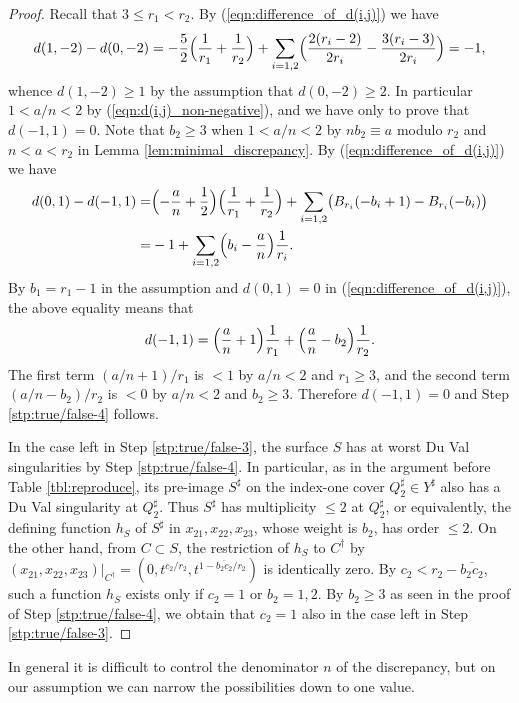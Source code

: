 \documentclass[a4paper,11pt]{amsart}
\theoremstyle{definition}
\theoremstyle{remark}
\numberwithin{equation}{section}
\begin{document}
\begin{proof}
Recall that $3\le r_1<r_2$.
By (\ref{eqn:difference_of_d(i,j)}) we have
\begin{align*}
d(1,-2)-d(0,-2)
= -\frac{5}{2}\Bigl(\frac{1}{r_1}+\frac{1}{r_2}\Bigr)
+\sum_{i=1,2}\Bigl(\frac{2(r_i-2)}{2r_i}-\frac{3(r_i-3)}{2r_i}\Bigr)
= -1,
\end{align*}
whence $d(1,-2)\ge1$ by the assumption that $d(0,-2)\ge2$.
In particular $1<a/n<2$ by (\ref{eqn:d(i,j)_non-negative}),
and we have only to prove that $d(-1,1)=0$.
Note that $b_2\ge3$ when $1<a/n<2$
by $nb_2 \equiv a$ modulo $r_2$
and $n<a<r_2$ in Lemma \ref{lem:minimal_discrepancy}.
By (\ref{eqn:difference_of_d(i,j)}) we have
\begin{align*}
d(0,1)-d(-1,1)
= & \Bigl(-\frac{a}{n}+\frac{1}{2}\Bigr)\Bigl(\frac{1}{r_1}+\frac{1}{r_2}\Bigr)
+\sum_{i=1,2}\bigl(B_{r_i}(-b_i+1)-B_{r_i}(-b_i)\bigr) \\
= & -1+\sum_{i=1,2}\Bigl(b_i-\frac{a}{n}\Bigr)\frac{1}{r_i}.
\end{align*}
By $b_1=r_1-1$ in the assumption
and $d(0,1)=0$ in (\ref{eqn:difference_of_d(i,j)}),
the above equality means that
\begin{align*}
d(-1,1)=\Bigl(\frac{a}{n}+1\Bigr)\frac{1}{r_1}+
\Bigl(\frac{a}{n}-b_2\Bigr)\frac{1}{r_2}.
\end{align*}
The first term $(a/n+1)/r_1$ is $<1$ by $a/n<2$ and $r_1\ge3$,
and the second term $(a/n-b_2)/r_2$ is $<0$ by $a/n<2$ and $b_2\ge3$.
Therefore $d(-1,1)=0$ and Step \ref{stp:true/false-4} follows.

In the case left in Step \ref{stp:true/false-3},
the surface $S$ has at worst Du Val singularities
by Step \ref{stp:true/false-4}.
In particular,
as in the argument before Table \ref{tbl:reproduce},
its pre-image $S^\sharp$ on the index-one cover $Q_2^\sharp \in Y^\sharp$
also has a Du Val singularity at $Q_2^\sharp$.
Thus $S^\sharp$ has multiplicity $\le 2$ at $Q_2^\sharp$,
or equivalently,
the defining function $h_S$ of $S^\sharp$ in $x_{21},x_{22},x_{23}$,
whose weight is $b_2$,
has order $\le2$.
On the other hand, from $C \subset S$,
the restriction of $h_S$ to $C^\dag$ by
$(x_{21},x_{22},x_{23})|_{C^\dag}=(0,t^{c_2/r_2},t^{1-\overline{b_2c_2}/r_2})$
is identically zero.
By $c_2<r_2-\overline{b_2c_2}$,
such a function $h_S$ exists only if $c_2=1$ or $b_2=1,2$.
By $b_2\ge3$ as seen in the proof of Step \ref{stp:true/false-4},
we obtain that $c_2=1$ also in the case left in Step \ref{stp:true/false-3}.
\setcounter{step}{0}
\end{proof}

In general it is difficult to control the denominator $n$ of the discrepancy,
but on our assumption we can narrow the possibilities down to one value.
\end{document}
